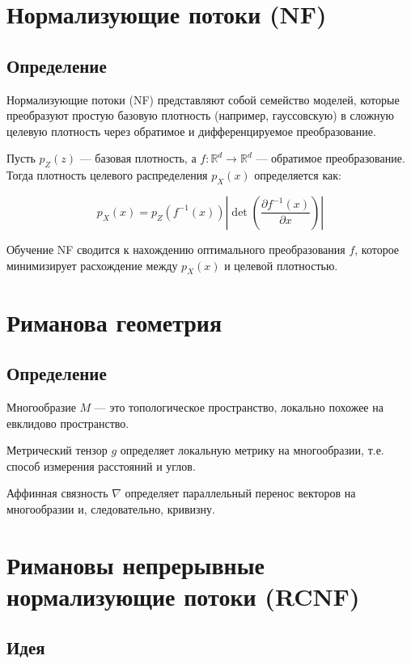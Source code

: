 \documentclass{article}
\begin{document}
\section{Нормализующие потоки (NF)}

\subsection{Определение}

Нормализующие потоки (NF) представляют собой семейство моделей, которые преобразуют простую базовую плотность (например, гауссовскую) в сложную целевую плотность через обратимое и дифференцируемое преобразование.

Пусть \( p_Z(z) \) — базовая плотность, а \( f: \mathbb{R}^d \rightarrow \mathbb{R}^d \) — обратимое преобразование. Тогда плотность целевого распределения \( p_X(x) \) определяется как:

\begin{equation}
    p_X(x) = p_Z(f^{-1}(x)) \left| \det \left( \frac{\partial f^{-1}(x)}{\partial x} \right) \right|
    \label{eq:nf_density}
\end{equation}

Обучение NF сводится к нахождению оптимального преобразования \( f \), которое минимизирует расхождение между \( p_X(x) \) и целевой плотностью.

\section{Риманова геометрия}

\subsection{Определение}

Многообразие \( M \) — это топологическое пространство, локально похожее на евклидово пространство.

Метрический тензор \( g \) определяет локальную метрику на многообразии, т.е. способ измерения расстояний и углов.

Аффинная связность \( \nabla \) определяет параллельный перенос векторов на многообразии и, следовательно, кривизну.

\section{Римановы непрерывные нормализующие потоки (RCNF)}

\subsection{Идея}
\end{document}
